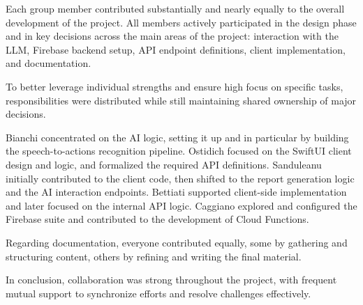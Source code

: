 \documentclass{article}
\begin{document}
Each group member contributed substantially and nearly equally to the overall development of the project.
All members actively participated in the design phase and in key decisions across the main areas of the project: interaction with the LLM, Firebase backend setup, API endpoint definitions, client implementation, and documentation.

To better leverage individual strengths and ensure high focus on specific tasks, responsibilities were distributed while still maintaining shared ownership of major decisions.

Bianchi concentrated on the AI logic, setting it up and in particular by building the speech-to-actions recognition pipeline.
Ostidich focused on the SwiftUI client design and logic, and formalized the required API definitions.
Sanduleanu initially contributed to the client code, then shifted to the report generation logic and the AI interaction endpoints.
Bettiati supported client-side implementation and later focused on the internal API logic.
Caggiano explored and configured the Firebase suite and contributed to the development of Cloud Functions.

Regarding documentation, everyone contributed equally, some by gathering and structuring content, others by refining and writing the final material.

In conclusion, collaboration was strong throughout the project, with frequent mutual support to synchronize efforts and resolve challenges effectively.
\end{document}
